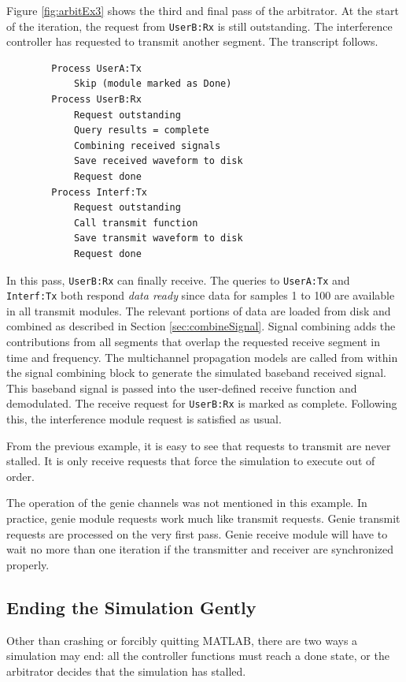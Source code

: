 Figure \ref{fig:arbitEx3} shows the third and final pass of the
arbitrator.  At the start of the iteration, the request from
\verb+UserB:Rx+ is still outstanding.  The interference controller
has requested to transmit another segment.  The transcript follows.

\begin{verbatim}
        Process UserA:Tx
            Skip (module marked as Done)
        Process UserB:Rx
            Request outstanding
            Query results = complete
            Combining received signals
            Save received waveform to disk
            Request done
        Process Interf:Tx
            Request outstanding
            Call transmit function
            Save transmit waveform to disk
            Request done
\end{verbatim}

In this pass, \verb+UserB:Rx+ can finally receive.  The queries to
\verb+UserA:Tx+ and \verb+Interf:Tx+ both respond \emph{data ready} since data
for samples 1 to 100 are available in all transmit modules.  The relevant
portions of data are loaded from disk and combined as described in Section
\ref{sec:combineSignal}.  Signal combining adds the contributions from all
segments that overlap the requested receive segment in time and frequency.  The
multichannel propagation models are called from within the signal combining
block to generate the simulated baseband received signal.  This baseband signal
is passed into the user-defined receive function and demodulated.  The receive
request for \verb+UserB:Rx+ is marked as complete.  Following this, the
interference module request is satisfied as usual.

From the previous example, it is easy to see that requests to transmit are
never stalled.  It is only receive requests that force the simulation to
execute out of order.

The operation of the genie channels was not mentioned in this
example.  In practice, genie module requests work much like transmit
requests. Genie transmit requests are processed on the very first
pass. Genie receive module will have to wait no more than one
iteration if the transmitter and receiver are synchronized properly.

\subsection{Ending the Simulation Gently}

Other than crashing or forcibly quitting MATLAB, there are two ways
a simulation may end: all the controller functions must reach a done
state, or the arbitrator decides that the simulation has stalled.

